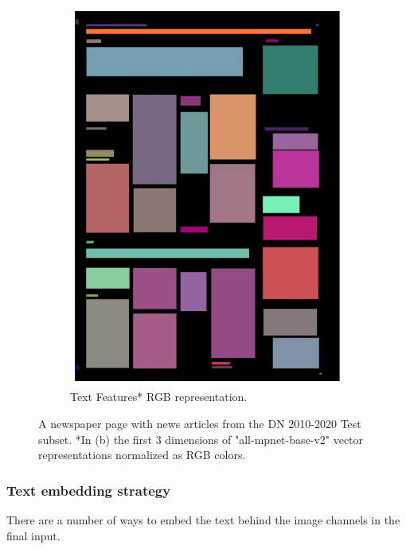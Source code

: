 \documentclass[oneside, english, bibtex]{kththesis}
\begin{document}
\begin{figure}[!htb]
\begin{adjustbox}{center,max size={\textwidth}{0.9\textheight}}
{\begin{subfigure}{0.75\textwidth}
  \includegraphics[width=\linewidth, clip=true, trim = 0mm 0mm 0mm 0mm]{figures/tf/AVThDFz.jpg}
  \caption{Text Features* RGB representation.}
  \label{fig:AVThDFz_tf}
\end{subfigure}}
\end{adjustbox}
  \caption{A newspaper page with news articles from the DN 2010-2020 Test subset. *In (b) the first 3 dimensions of "all-mpnet-base-v2" vector representations normalized as RGB colors.}
\label{fig:AVThDFz_tf}
\end{figure}

\clearpage

\subsubsection{Text embedding strategy}
\label{subs:textembeddingstrat}
There are a number of ways to embed the text behind the image channels in the final input.
\end{document}
